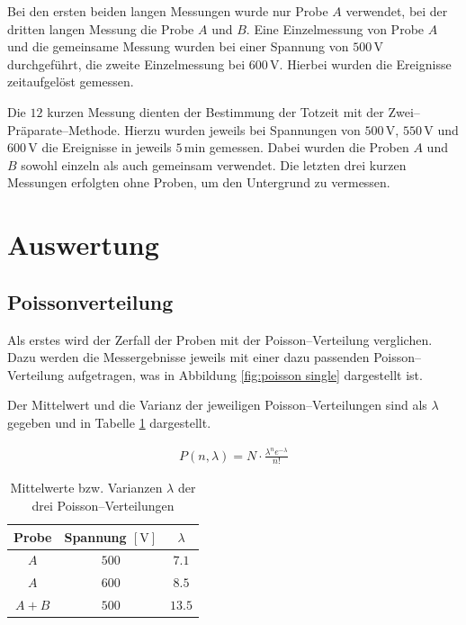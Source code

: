 \documentclass[12pt,a4paper]{scrartcl}
\numberwithin{equation}{section} %
\begin{document}
Bei den ersten beiden langen Messungen wurde nur Probe $A$ verwendet, bei der dritten langen Messung die Probe $A$ und $B$. Eine Einzelmessung von Probe $A$ und die gemeinsame Messung wurden bei einer Spannung von $500\mathrm{\,V}$ durchgeführt, die zweite Einzelmessung bei $600\mathrm{\,V}$. Hierbei wurden die Ereignisse zeitaufgelöst gemessen.

Die $12$ kurzen Messung dienten der Bestimmung der Totzeit mit der Zwei--Präparate--Methode. Hierzu wurden jeweils bei Spannungen von $500\mathrm{\,V}$, $550\mathrm{\,V}$ und $600\mathrm{\,V}$ die Ereignisse in jeweils $5\mathrm{\,min}$ gemessen. Dabei wurden die Proben $A$ und $B$ sowohl einzeln als auch gemeinsam verwendet. Die letzten drei kurzen Messungen erfolgten ohne Proben, um den Untergrund zu vermessen.

\clearpage
\hypertarget{auswertung}{%
\section{Auswertung}\label{auswertung}}

\hypertarget{poissonverteilung}{%
\subsection{Poissonverteilung}\label{poissonverteilung}}
Als erstes wird der Zerfall der Proben mit der Poisson--Verteilung verglichen. Dazu werden die Messergebnisse jeweils mit einer dazu passenden Poisson--Verteilung aufgetragen, was in Abbildung \ref{fig:poisson single} dargestellt ist.

Der Mittelwert und die Varianz der jeweiligen Poisson--Verteilungen sind als $\lambda$ gegeben und in Tabelle \ref{table:poisson} dargestellt.

\begin{eqnarray}
	P(n,\lambda) = N \cdot \frac{\lambda^n e^{-\lambda}}{n!}
\end{eqnarray}

\begin{table}[h!]
	\centering
	\begin{tabular}{c|c|c}
		Probe & Spannung $[\mathrm{V}]$ & $\lambda$ \\
		\hline
		$A$ & $500$ & $7.1$ \\
		$A$ & $600$ & $8.5$ \\
		$A+B$ & $500$ & $13.5$ \\
	\end{tabular}
	\caption{Mittelwerte bzw. Varianzen $\lambda$  der drei Poisson--Verteilungen}
	\label{table:poisson}
\end{table}
\end{document}
